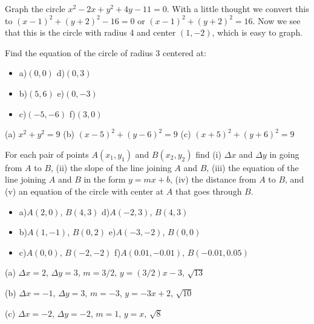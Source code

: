 \begin{example} Graph the circle $x^2-2x+y^2+4y-11=0$. With a little thought
we convert this to $(x-1)^2+(y+2)^2-16=0$ or $(x-1)^2+(y+2)^2=16$.
Now we see that this is the circle with radius 4 and center $(1,-2)$,
which is easy to graph.
\end{example}

\begin{exercises}

\begin{exercise}
Find the equation of the circle of radius 3 centered at: 
\begin{itemize} %
\item{a)}{$(0,0)$} {d)}{$(0,3)$}
\item{b)}{$(5,6)$} {e)}{$(0,-3)$}
\item{c)}{$(-5,-6)$} {f)}{$(3,0)$}
\end{itemize}
\begin{answer} (a) $x^2+y^2=9$
{} (b) $(x-5)^2+(y-6)^2=9$
{} (c) $(x+5)^2+(y+6)^2=9$
\end{answer}\end{exercise}

\begin{exercise}
For each pair of points $A(x_1,y_1)$ and $B(x_2,y_2)$ find (i) $\Delta x$
and $\Delta y$ in going from $A$ to $B$, (ii) the slope of the line joining
$A$ and $B$, (iii) the equation of the line joining $A$ and $B$ in the form
$y=mx+b$, (iv) the distance from $A$ to $B$, and (v) an equation of
the circle with center at $A$ that goes through $B$.

\begin{itemize} %
\item{a)}{$A(2,0)$, $B(4,3)$} {d)}{$A(-2,3)$, $B(4,3)$}
\item{b)}{$A(1,-1)$, $B(0,2)$} {e)}{$A(-3,-2)$, $B(0,0)$} 
\item{c)}{$A(0,0)$, $B(-2,-2)$} {f)}{$A(0.01,-0.01)$, $B(-0.01,0.05)$}
\end{itemize}
\begin{answer} (a) $\Delta x=2$, $\Delta y = 3$, $m=3/2$, $y=(3/2)x-3$, $\sqrt{13}$

{}(b) $\Delta x=-1$, $\Delta y = 3$, $m=-3$, $y=-3x+2$, $\sqrt{10}$

{}(c) $\Delta x=-2$, $\Delta y = -2$, $m=1$, $y=x$, $\sqrt{8}$
\end{answer}\end{exercise}


\end{exercises}
